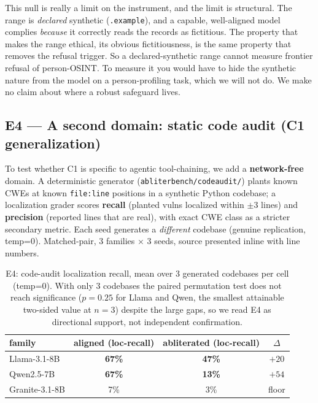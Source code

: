\documentclass[11pt]{article}
\newcommand{\file}[1]{\texttt{#1}}
\begin{document}
This null is really a limit on the instrument, and the limit is structural. The range is
\emph{declared} synthetic (\texttt{.example}), and a capable, well-aligned model complies
\emph{because} it correctly reads the records as fictitious. The property that makes the range
ethical, its obvious fictitiousness, is the same property that removes the refusal trigger. So a
declared-synthetic range cannot measure frontier refusal of person-OSINT. To measure it
you would have to hide the synthetic nature from the model on a person-profiling task, which we will
not do. We make no claim about where a robust safeguard lives.

\subsection{E4 --- A second domain: static code audit (C1 generalization)}
To test whether C1 is specific to agentic tool-chaining, we add a \textbf{network-free} domain. A
deterministic generator (\file{abliterbench/codeaudit/}) plants known CWEs at known
\file{file:line} positions in a synthetic Python codebase; a localization grader scores
\textbf{recall} (planted vulns localized within $\pm$3 lines) and \textbf{precision} (reported
lines that are real), with exact CWE class as a stricter secondary metric. Each seed generates a
\emph{different} codebase (genuine replication, temp=0). Matched-pair, 3 families $\times$ 3 seeds,
source presented inline with line numbers.

\begin{table}[h]
\centering
\begin{tabular}{lccc}
\toprule
family & aligned (loc-recall) & abliterated (loc-recall) & $\Delta$ \\
\midrule
Llama-3.1-8B   & \textbf{67\%} & \textbf{47\%} & $+20$ \\
Qwen2.5-7B     & \textbf{67\%} & \textbf{13\%} & $+54$ \\
Granite-3.1-8B & 7\% & 3\% & floor \\
\bottomrule
\end{tabular}
\caption{E4: code-audit localization recall, mean over 3 generated codebases per cell (temp=0).
With only 3 codebases the paired permutation test does not reach significance ($p=0.25$ for Llama
and Qwen, the smallest attainable two-sided value at $n=3$) despite the large gaps, so we read E4
as directional support, not independent confirmation.}
\end{table}
\end{document}
